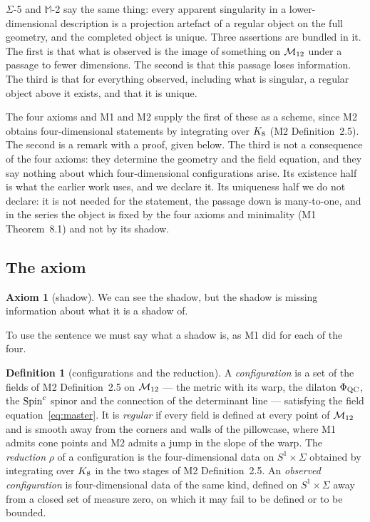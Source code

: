 \documentclass[11pt,a4paper]{article}
\theoremstyle{plain}
\theoremstyle{definition}
\newtheorem{definition}[theorem]{Definition}
\newtheorem{axiom}{Axiom}
\theoremstyle{remark}
\newcommand{\Max}[1]{$\mathbb{M}$-#1}
\newcommand{\Sig}[1]{$\Sigma$-#1}
\begin{document}
\Sig{5} and \Max{2} say the same thing: every apparent singularity in a lower-dimensional description is a projection artefact of a regular object on the full geometry, and the completed object is unique. Three assertions are bundled in it. The first is that what is observed is the image of something on $\mathcal{M}_{12}$ under a passage to fewer dimensions. The second is that this passage loses information. The third is that for everything observed, including what is singular, a regular object above it exists, and that it is unique.

The four axioms and M1 and M2 supply the first of these as a scheme, since M2 obtains four-dimensional statements by integrating over $K_8$ (M2 Definition~2.5). The second is a remark with a proof, given below. The third is not a consequence of the four axioms: they determine the geometry and the field equation, and they say nothing about which four-dimensional configurations arise. Its existence half is what the earlier work uses, and we declare it. Its uniqueness half we do not declare: it is not needed for the statement, the passage down is many-to-one, and in the series the object is fixed by the four axioms and minimality (M1 Theorem~8.1) and not by its shadow.

\subsection{The axiom}\label{sec:fifth}

\begin{axiom}[shadow]\label{ax:A5}
We can see the shadow, but the shadow is missing information about what it is a shadow of.
\end{axiom}

To use the sentence we must say what a shadow is, as M1 did for each of the four.

\begin{definition}[configurations and the reduction]\label{def:reduction}
A \emph{configuration} is a set of the fields of M2 Definition~2.5 on $\mathcal{M}_{12}$ --- the metric with its warp, the dilaton $\Phi_{\mathrm{QC}}$, the $\text{Spin}^c$ spinor and the connection of the determinant line --- satisfying the field equation~\eqref{eq:master}. It is \emph{regular} if every field is defined at every point of $\mathcal{M}_{12}$ and is smooth away from the corners and walls of the pillowcase, where M1 admits cone points and M2 admits a jump in the slope of the warp. The \emph{reduction} $\rho$ of a configuration is the four-dimensional data on $S^{1}\times\Sigma$ obtained by integrating over $K_8$ in the two stages of M2 Definition~2.5. An \emph{observed configuration} is four-dimensional data of the same kind, defined on $S^{1}\times\Sigma$ away from a closed set of measure zero, on which it may fail to be defined or to be bounded.
\end{definition}
\end{document}
